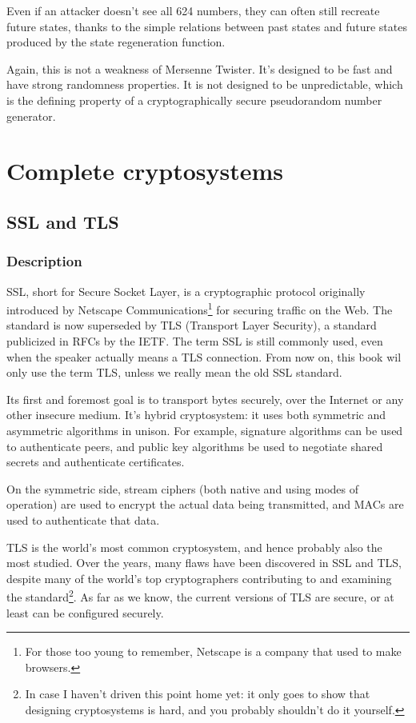 \documentclass[11pt,ebook,table,dvipsnames]{memoir}
\begin{document}
Even if an attacker doesn't see all 624 numbers, they can often still
recreate future states, thanks to the simple relations between past
states and future states produced by the state regeneration function.

Again, this is not a weakness of Mersenne Twister. It's designed to be
fast and have strong randomness properties. It is not designed to be
unpredictable, which is the defining property of a cryptographically
secure pseudorandom number generator.
\part{Complete cryptosystems}
\label{sec-3}
\chapter{SSL and TLS}
\label{sec-3-1}
\section{Description}
\label{sec-3-1-1}

SSL, short for Secure Socket Layer, is a cryptographic protocol
originally introduced by Netscape Communications\footnote{For those too
young to remember, Netscape is a company that used to make browsers.}
for securing traffic on the Web. The standard is now superseded by TLS
(Transport Layer Security), a standard publicized in RFCs by the IETF.
The term SSL is still commonly used, even when the speaker actually
means a TLS connection. From now on, this book wil only use the term
TLS, unless we really mean the old SSL standard.

Its first and foremost goal\cite{tls12} is to transport bytes
securely, over the Internet or any other insecure medium. It's hybrid
cryptosystem: it uses both symmetric and asymmetric algorithms in
unison. For example, signature algorithms can be used to authenticate
peers, and public key algorithms be used to negotiate shared secrets
and authenticate certificates.

On the symmetric side, stream ciphers (both native and using modes of
operation) are used to encrypt the actual data being transmitted, and
MACs are used to authenticate that data.

TLS is the world's most common cryptosystem, and hence probably also
the most studied. Over the years, many flaws have been discovered in
SSL and TLS, despite many of the world's top cryptographers
contributing to and examining the standard\footnote{In case I haven't
driven this point home yet: it only goes to show that designing
cryptosystems is hard, and you probably shouldn't do it yourself.}. As
far as we know, the current versions of TLS are secure, or at least
can be configured securely.
\end{document}

